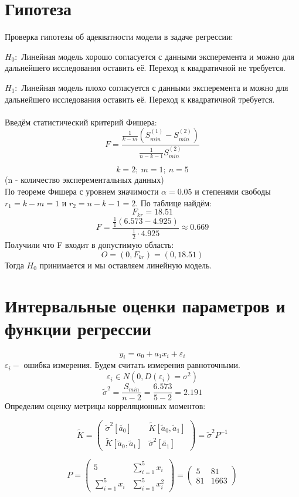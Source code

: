 \documentclass{article}
\begin{document}
\section*{Гипотеза}
Проверка гипотезы об адекватности модели в задаче регрессии:

$H_0:$ Линейная модель хорошо согласуется с данными эксперемента и можно для дальнейшего исследования оставить её. Переход к квадратичной не требуется.

$H_1:$ Линейная модель плохо согласуется с данными эксперемента и можно для дальнейшего исследования оставить её. Переход к квадратичной требуется.
\\ \\
Введём статистический критерий Фишера:
\[F = \frac{\frac{1}{k-m}(S^{(1)}_{min} - S^{(2)}_{min})}{\frac{1}{n-k-1}S^{(2)}_{min}}\]

\[k=2;\ m=1;\ n=5\]
(n - количество эксперементальных данных)
\\
По теореме Фишера с уровнем значимости $\alpha = 0.05$ и степенями свободы $r_1 = k-m = 1$ и $r_2 = n-k-1 = 2$.
По таблице найдём:
\[F_{kr} = 18.51\]
\[F = \frac{\frac{1}{1}(6.573 - 4.925)}{\frac{1}{2}\cdot 4.925} \approx 0.669\]
Получили что F входит в допустимую область:
\[O = (0, F_{kr}) = (0, 18.51)\]
Тогда $H_0$ принимается и мы оставляем линейную модель.

\section*{Интервальные оценки параметров и функции регрессии}

\[y_i = a_0+a_1x_i+\varepsilon_i\]
$\varepsilon_i - $ ошибка измерения. Будем считать измерения равноточными.
\[\varepsilon_i \in N(0, D(\varepsilon_i) = \sigma^2)\]
\[\tilde{\sigma}^2 = \frac{S_{min}}{n-2} = \frac{6.573}{5-2} = 2.191\]
Определим оценку метрицы корреляционных моментов:

\[\tilde{K} = 
\begin{pmatrix}
    \tilde{\sigma}^2[\tilde{a_0}]& \tilde{K}[\tilde{a}_0, \tilde{a}_1]\\
    \tilde{K}[\tilde{a}_0, \tilde{a}_1] & \tilde{\sigma}^2[\tilde{a_1}]
\end{pmatrix}
= \tilde{\sigma}^2P^{-1}\]

\[P = 
\begin{pmatrix}
    5& \sum_{i=1}^{5}x_i\\
    \sum_{i=1}^{5}x_i& \sum_{i=1}^{5}x_i^2
\end{pmatrix}
=
\begin{pmatrix}
    5& 81\\
    81& 1663
\end{pmatrix}\]
\end{document}
